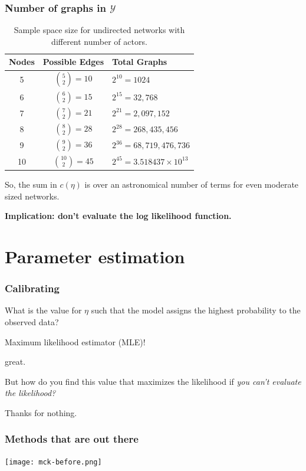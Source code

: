 \documentclass[slidestop,compress, 10pt]{beamer}
\def\YY{{\mathcal Y}}
\begin{document}
\frame
{
\frametitle{Number of graphs in $\YY$}
\begin{table}[h!] 
\caption{Sample space size for undirected networks with different number of 
actors.}

\begin{tabular}{ccl} 
\hline 
Nodes & Possible Edges & Total Graphs \\ [1ex]
\hline
5 & ${5 \choose 2} = 10$ & $2^{10} = 1024$ \\ [1ex]
6 & ${6 \choose 2} = 15$ & $2^{15} = 32,768$ \\ [1ex]
7 & ${7 \choose 2} = 21$ & $2^{21} = 2,097,152$ \\ [1ex]
8 & ${8 \choose 2} = 28$ & $2^{28} = 268,435,456$ \\ [1ex]
9 & ${9 \choose 2} = 36$ & $2^{36} = 68,719,476,736$ \\ [1ex]
10 & ${10 \choose 2} = 45$ & $2^{45} = 3.518437\times10^{13}$ \\ [1ex]
\hline 
\end{tabular} \label{T:number graphs}
\end{table}

So, the sum in $c(\eta)$ is over an astronomical number of terms for 
even moderate sized networks.
\vspace{2mm}

\textbf{Implication: don't evaluate the log likelihood function.}
}

\section{Parameter estimation}
\frame
{
\frametitle{Calibrating}
What is the value for $\eta$ such that the model assigns the highest probability to the observed data?
\vspace{2mm}

Maximum likelihood estimator (MLE)!
\vspace{2mm}

great.
\vspace{2mm}

But how do you find this value that maximizes the likelihood if \emph{you can't evaluate the likelihood?}
\vspace{2mm}

Thanks for nothing.
}

\frame
{
\frametitle{Methods that are out there}
\begin{center} 
\texttt{[image: mck-before.png]}
\end{center} 
}
\end{document}
